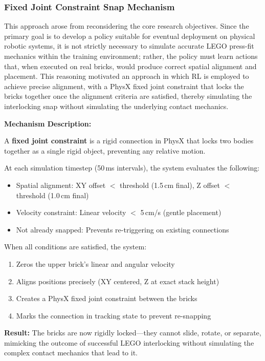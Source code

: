 \documentclass[12pt,a4paper,oneside]{report}
\begin{document}
\subsubsection{Fixed Joint Constraint Snap Mechanism}

This approach arose from reconsidering the core research objectives. Since the primary goal is to develop a policy suitable for eventual deployment on physical robotic systems, it is not strictly necessary to simulate accurate LEGO press-fit mechanics within the training environment; rather, the policy must learn actions that, when executed on real bricks, would produce correct spatial alignment and placement. This reasoning motivated an approach in which RL is employed to achieve precise alignment, with a PhysX fixed joint constraint that locks the bricks together once the alignment criteria are satisfied, thereby simulating the interlocking snap without simulating the underlying contact mechanics.

\textbf{Mechanism Description:}

A \textbf{fixed joint constraint} is a rigid connection in PhysX that locks two bodies together as a single rigid object, preventing any relative motion.

At each simulation timestep (50\,ms intervals), the system evaluates the following:
\begin{itemize}
    \item Spatial alignment: XY offset $<$ threshold (1.5\,cm final), Z offset $<$ threshold (1.0\,cm final)
    \item Velocity constraint: Linear velocity $<$ 5\,cm/s (gentle placement)
    \item Not already snapped: Prevents re-triggering on existing connections
\end{itemize}

When all conditions are satisfied, the system:
\begin{enumerate}
    \item Zeros the upper brick's linear and angular velocity
    \item Aligns positions precisely (XY centered, Z at exact stack height)
    \item Creates a PhysX fixed joint constraint between the bricks
    \item Marks the connection in tracking state to prevent re-snapping
\end{enumerate}

\textbf{Result:} The bricks are now rigidly locked---they cannot slide, rotate, or separate, mimicking the outcome of successful LEGO interlocking without simulating the complex contact mechanics that lead to it.
\end{document}
